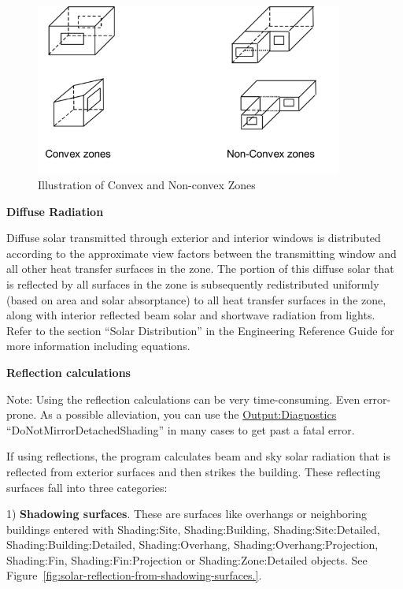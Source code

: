 \begin{figure}[hbtp] %
\centering
\includegraphics[width=0.9\textwidth, height=0.5\textheight, keepaspectratio=true]{media/image002.png}
\caption{Illustration of Convex and Non-convex Zones \protect \label{fig:illustration-of-convex-and-non-convex-zones}}
\end{figure}

\textbf{Diffuse Radiation}

Diffuse solar transmitted through exterior and interior windows is distributed according to the approximate view factors between the transmitting window and all other heat transfer surfaces in the zone.
The portion of this diffuse solar that is reflected by all surfaces in the zone is subsequently redistributed uniformly (based on area and solar absorptance) to all heat transfer surfaces in the zone, along with interior reflected beam solar and shortwave radiation from lights. Refer to the section ``Solar Distribution'' in the Engineering Reference Guide for more information including equations.

\textbf{Reflection calculations}

Note: Using the reflection calculations can be very time-consuming. Even error-prone. As a possible alleviation, you can use the \hyperref[outputdiagnostics]{Output:Diagnostics} ``DoNotMirrorDetachedShading'' in many cases to get past a fatal error.

If using reflections, the program calculates beam and sky solar radiation that is reflected from exterior surfaces and then strikes the building. These reflecting surfaces fall into three categories:

1) \textbf{Shadowing surfaces}. These are surfaces like overhangs or neighboring buildings entered with Shad\-ing:\-Site, Shad\-ing:\-Build\-ing, Shad\-ing:\-Site:\-Detailed, Shad\-ing:\-Build\-ing:\-Detailed, Shad\-ing:\-Over\-hang, Shad\-ing:\-Over\-hang:Pro\-jection, Shad\-ing:\-Fin, Shad\-ing:\-Fin:\-Pro\-jection or Shad\-ing:\-Zone:\-Detailed objects. See Figure~\ref{fig:solar-reflection-from-shadowing-surfaces.}.

